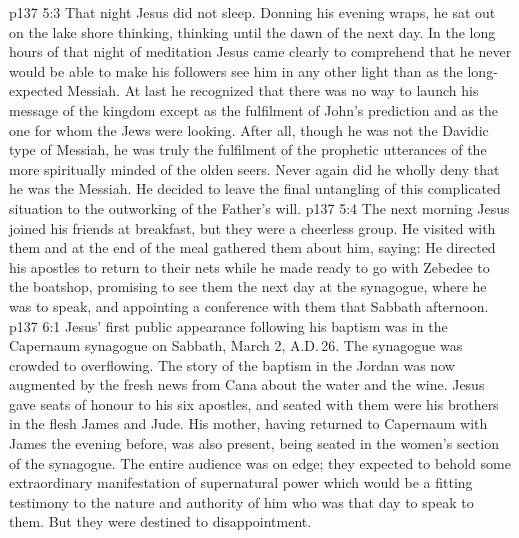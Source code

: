 \vs p137 5:3 That night Jesus did not sleep. Donning his evening wraps, he sat out on the lake shore thinking, thinking until the dawn of the next day. In the long hours of that night of meditation Jesus came clearly to comprehend that he never would be able to make his followers see him in any other light than as the long\hyp{}expected Messiah. At last he recognized that there was no way to launch his message of the kingdom except as the fulfilment of John’s prediction and as the one for whom the Jews were looking. After all, though he was not the Davidic type of Messiah, he was truly the fulfilment of the prophetic utterances of the more spiritually minded of the olden seers. Never again did he wholly deny that he was the Messiah. He decided to leave the final untangling of this complicated situation to the outworking of the Father’s will.
\vs p137 5:4 The next morning Jesus joined his friends at breakfast, but they were a cheerless group. He visited with them and at the end of the meal gathered them about him, saying:  He directed his apostles to return to their nets while he made ready to go with Zebedee to the boatshop, promising to see them the next day at the synagogue, where he was to speak, and appointing a conference with them that Sabbath afternoon.
\vs p137 6:1 Jesus’ first public appearance following his baptism was in the Capernaum synagogue on Sabbath, March 2, A.D.\,26. The synagogue was crowded to overflowing. The story of the baptism in the Jordan was now augmented by the fresh news from Cana about the water and the wine. Jesus gave seats of honour to his six apostles, and seated with them were his brothers in the flesh James and Jude. His mother, having returned to Capernaum with James the evening before, was also present, being seated in the women’s section of the synagogue. The entire audience was on edge; they expected to behold some extraordinary manifestation of supernatural power which would be a fitting testimony to the nature and authority of him who was that day to speak to them. But they were destined to disappointment.
